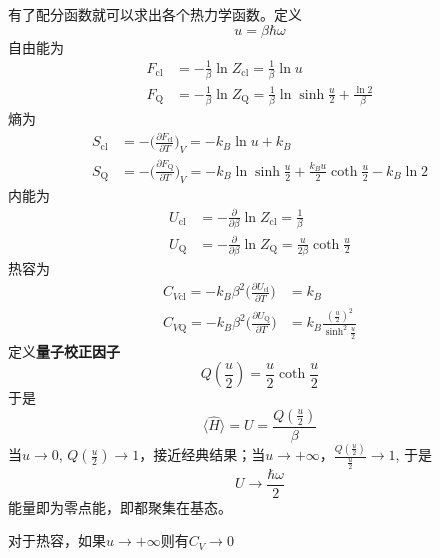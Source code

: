     有了配分函数就可以求出各个热力学函数。定义
    \[ u = \beta\hbar\omega \]
    自由能为
    \begin{align*}
        F_\mathrm{cl} &= -\frac 1{\beta} \ln{Z_\mathrm{cl}} = \frac 1{\beta} \ln{u}\\
        F_\mathrm{Q} &= -\frac 1{\beta} \ln{Z_\mathrm{Q}} = \frac 1{\beta}\ln{\sinh{\frac u2}}+ \frac {\ln{2}}{\beta}
    \end{align*}
    熵为
    \begin{align*}
        S_\mathrm{cl} &= -\bigg(\frac {\partial F_{\mathrm{cl}}}{\partial T}\bigg)_V = -k_B \ln{u} + k_B\\
        S_\mathrm{Q} &= -\bigg(\frac {\partial F_{\mathrm{Q}}}{\partial T}\bigg)_V = -k_B \ln{\sinh{\frac u2}} + \frac {k_Bu}2 \coth{\frac u2} - k_B \ln{2}
    \end{align*}
    内能为
    \begin{align*}
        U_\mathrm{cl} &= -\frac {\partial}{\partial \beta}\ln{Z_\mathrm{cl}} = \frac 1{\beta}\\
        U_\mathrm{Q} &= -\frac {\partial}{\partial \beta}\ln{Z_\mathrm{Q}} = \frac {u}{2\beta} \coth{\frac u2}
    \end{align*}
    热容为
    \begin{align*}
        C_{V\mathrm{cl}} = -k_B \beta^2 \bigg(\frac {\partial U_\mathrm{cl}}{\partial T}) &= k_B\\
        C_{V\mathrm{Q}} = -k_B \beta^2 \bigg(\frac {\partial U_\mathrm{Q}}{\partial T}) &= k_B \frac {(\frac u2)^2}{\sinh^2{\frac u2}}
    \end{align*}
    定义\textbf{量子校正因子}
    \[ Q(\frac u2) = \frac u2 \coth{\frac u2} \]
    于是 
    \[ \langle \hat{H} \rangle = U = \frac {Q(\frac u2)}{\beta} \]
    当$u \to 0$, $Q(\frac u2) \to 1$，接近经典结果；当$u \to +\infty$，$\frac {Q(\frac u2)}{\frac u2} \to 1$, 于是
    \[U \to \frac {\hbar \omega}2 \]
    能量即为零点能，即都聚集在基态。

    对于热容，如果$u \to +\infty$则有$C_V \to 0$

    
    

